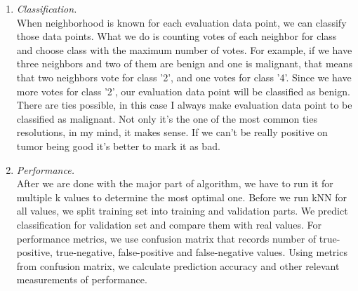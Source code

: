 \documentclass[12pt, letterpaper]{article}
\begin{document}
\begin{enumerate}[label=\Roman*.]
\begin{enumerate}[label=\arabic*.]
	\item {\it Classification. }\\
	When neighborhood is known for each  evaluation data point, we can classify those data points. What we do is counting votes of each neighbor for class and choose class with the maximum number of votes. For example, if we have three neighbors and two of them are benign and one is malignant, that means that two neighbors vote for class '2', and one votes for class '4'. Since we have more votes for class '2', our evaluation data point will be classified as benign. There are ties possible, in this case I always make evaluation data point to be classified as malignant. Not only it's the one of the most common ties resolutions, in my mind, it makes sense. If we can't be really positive on tumor being good it's better to mark it as bad. \\
	
	\item {\it Performance. }\\
	After we are done with the major part of algorithm, we have to run it for multiple k values to determine the most optimal one. Before we run kNN for all values, we split training set into training and validation parts. We predict classification for validation set and compare them with real values. For performance metrics, we use confusion matrix that records number of true-positive, true-negative, false-positive and false-negative values. Using metrics from confusion matrix, we calculate prediction accuracy and other relevant measurements of performance. \\
	

\end{enumerate}
\end{enumerate}
\end{document}
